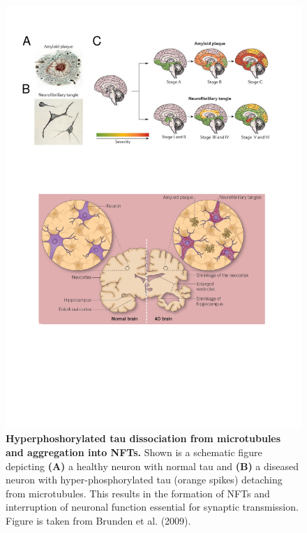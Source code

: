 \begin{figure}[!ht]
	\centering
	\includegraphics[page=13,trim={0 14cm 0cm 0cm},clip, scale = 0.7]{Figures/Introduction_Figures.pdf}
	\captionsetup{width=0.95\textwidth,singlelinecheck=off}
	\caption[Tau tangle hypothesis]%
	{\textbf{Hyperphoshorylated tau dissociation from microtubules and aggregation into NFTs.} Shown is a schematic figure depicting \textbf{(A)} a healthy neuron with normal tau and \textbf{(B)} a diseased neuron with hyper-phosphorylated tau (orange spikes) detaching from microtubules. This results in the formation of NFTs and interruption of neuronal function essential for synaptic transmission. Figure is taken from Brunden et al. (2009)\cite{Brunden2009}.
	}
	\label{fig:tau_hypothesis}
\end{figure}	

